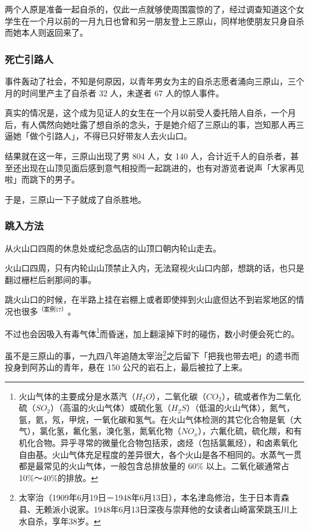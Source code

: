 \documentclass[UTF8]{ctexart}
\begin{document}
两个人原是准备一起自杀的，仅此一点就够使周围震惊的了，经过调查知道这个女学生在一个月以前的一月九日也曾和另一朋友登上三原山，同样地使朋友只身自杀而她本人则返回来了。

\subsubsection*{死亡引路人}

事件轰动了社会，不知是何原因，以青年男女为主的自杀志愿者涌向三原山，三个月的时间里产主了自杀者 32 人，未遂者 67 人的惊人事件。

真实的情况是，这个成为见证人的女生在一个月以前受人委托陪人自杀，一个月后，有人偶然向她吐露了想自杀的念头，于是她介绍了三原山的事，岂知那人再三逼她「做个引路人」，不得已只好带友人去火山口。

结果就在这一年，三原山出现了男 804 人，女 140 人，合计近千人的自杀者，甚至还出现在山顶见面后感到意气相投而一起跳进的，也有对游览者说声「大家再见啦」而跳下的男子。

于是，三原山一下子就成了自杀胜地。

\subsubsection*{跳入方法}

从火山口四周的休息处或纪念品店的山顶口朝内轮山走去。

火山口四周，只有内轮山山顶禁止入内，无法窥视火山口内部，想跳的话，也只是翻过栅栏后剎那间的事。 

跳火山口的时候，在半路上挂在岩棚上或者即使摔到火山底但达不到岩浆地区的情况也很多$^{（案例 17）}$。

不过也会因吸入有毒气体\footnote{火山气体的主要成分是水蒸汽（$H_2O$），二氧化碳（$CO_2$），硫或者作为二氧化硫（$SO_2$）（高温的火山气体）或硫化氢（$H_2S$）（低温的火山气体），氮气，氩，氦，氖，甲烷，一氧化碳和氢气。在火山气体检测的其它化合物是氧（大气），氯化氢，氟化氢，溴化氢，氮氧化物（$NO_x$），六氟化硫，硫化羰，和有机化合物。异乎寻常的微量化合物包括汞，卤烃（包括氯氟烃），和卤素氧化自由基。火山气体充足程度的差异很大，各个火山是各不相同的。水蒸气一贯都是最常见的火山气体，一般包含总排放量的 60\% 以上。二氧化碳通常占 10\%～40\%的排放。}而昏迷，加上翻滚掉下时的碰伤，数小时便会死亡的。 

虽不是三原山的事，一九四八年追随太宰治\footnote{太宰治（1909年6月19日－1948年6月13日），本名津岛修治，生于日本青森县、无赖派小说家。1948年6月13日深夜与崇拜他的女读者山崎富荣跳玉川上水自杀，享年38岁。}之后留下「把我也带去吧」的遗书而投身到阿苏山的青年，悬在 150 公尺的岩石上，最后被拉了上来。
\end{document}
